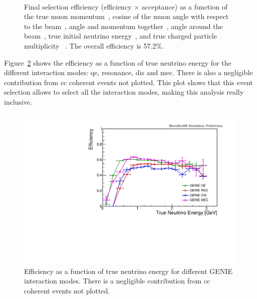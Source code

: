 \begin{figure}[]
{   \label{fig:eff_phi}} \quad
{} \\ 
\caption[Selection Efficiencies]{Final selection efficiency (efficiency $\times$ acceptance) as a function of the true muon momentum~\protect{}, cosine of the muon angle with respect to the beam~\protect{}, angle and momentum together~\protect{}, angle around the beam~\protect{}, true initial neutrino energy~\protect{}, and true charged particle multiplicity~\protect{} . The overall efficiency is 57.2\%.}
\label{fig:eff}
\end{figure}





Figure~\ref{fig:efficiency_mode} shows the efficiency as a function of true neutrino energy for the different \g interaction modes: \acrshort{qe}, resonance, \acrshort{dis} and \acrshort{mec}. There is also a negligible contribution from \acrshort{cc} coherent events not plotted. This plot shows that this event selection allows to select all the interaction modes, making this analysis really inclusive.


\begin{figure}[]
\centering
\includegraphics[width=.60\textwidth]{images/EfficiencyPlots/efficiency_mode}
\caption[Efficiency for Different Interaction Modes]{Efficiency as a function of true neutrino energy for different GENIE interaction modes. There is a negligible contribution from \acrshort{cc} coherent events not plotted.}
\label{fig:efficiency_mode}
\end{figure}


